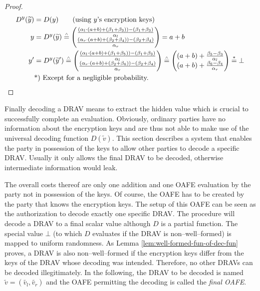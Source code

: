 \begin{proof}
  \begin{align*}
    D^y(\widetilde{y}) &= D(y) \qquad\text{(using $y$'s encryption keys)}\\
    y &= D^y(\widetilde{y}) \stackrel{\scriptscriptstyle\wedge}{=}
    \begin{pmatrix}
      \frac{(\alpha_l \cdot (a+b) + (\beta_1 + \beta_3)) - (\beta_1+\beta_3)}
           {\alpha_l}\\
      \frac{(\alpha_r \cdot (a+b) + (\beta_2 + \beta_4)) - (\beta_2+\beta_4)}
           {\alpha_r}\\
    \end{pmatrix}
    = a+b\\
    y' &= D^y(\widetilde{y}')
    \stackrel{\scriptscriptstyle\wedge}{=}
    \begin{pmatrix}
      \frac{(\alpha_l \cdot (a+b) + (\beta_1 + \beta_5)) - (\beta_1+\beta_3)}
           {\alpha_l}\\
      \frac{(\alpha_r \cdot (a+b) + (\beta_2 + \beta_6)) - (\beta_2+\beta_4)}
           {\alpha_r}\\
    \end{pmatrix}
    \stackrel{\scriptscriptstyle\wedge}{=}
    \begin{pmatrix}
      (a+b) +
      \frac{\beta_5 - \beta_3}{\alpha_l}\\
      (a+b) +
      \frac{\beta_6 - \beta_4}{\alpha_r}\\
    \end{pmatrix}
    \stackrel{*}{=} \bot\\
    &\text{*) Except for a negligible probability.}{}
  \end{align*}
\end{proof}


\label{sec:drav-final-decoding}

Finally decoding a DRAV means to extract the hidden value which is crucial to
successfully complete an evaluation. Obviously, ordinary parties have no
information about the encryption keys and are thus not able to make use of the
universal decoding function $D(\widetilde{v})$. This section describes a system
that enables the party in possession of the keys to allow other parties to
decode a specific DRAV\@. Usually it only allows the final DRAV to be decoded,
otherwise intermediate information would leak.

The overall costs thereof are only one addition and one OAFE evaluation by the
party not in possession of the keys. Of course, the OAFE has to be created by
the party that knows the encryption keys. The setup of this OAFE can be seen as
the authorization to decode exactly one specific DRAV\@. The procedure will
decode a DRAV to a final scalar value although $D$ is a partial function. The
special value $\bot$ (to which $D$ evaluates if the DRAV is non--well--formed)
is mapped to uniform randomness. As Lemma \ref{lem:well-formed-fun-of-dec-fun}
proves, a DRAV is also non--well--formed if the encryption keys differ from the
keys of the DRAV whose decoding was intended. Therefore, no other DRAVs can be
decoded illegitimately. In the following, the DRAV to be decoded is named
$\widetilde{v} = (\widetilde{v_l}, \widetilde{v_r})$ and the OAFE permitting the
decoding is called the \emph{final OAFE}.


